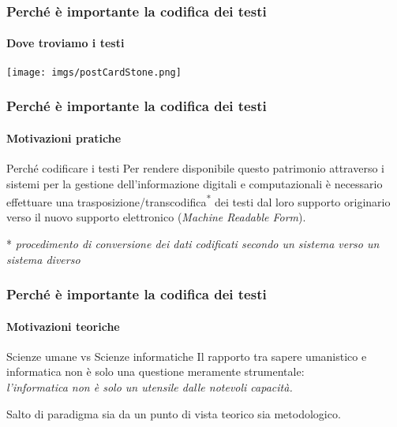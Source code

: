 \begin{frame}
    \frametitle{Perché è importante la codifica dei testi}
    \framesubtitle{Dove troviamo i testi}
    \addtocounter{nframe}{1}
    
    \begin{center}

        \texttt{[image: imgs/postCardStone.png]}

    \end{center}

\end{frame}

\begin{frame}
    \frametitle{Perché è importante la codifica dei testi}
    \framesubtitle{Motivazioni pratiche}
    \addtocounter{nframe}{1}
    
    \begin{block}{Perché codificare i testi}
        Per rendere disponibile questo patrimonio attraverso i sistemi per la gestione dell'informazione digitali e computazionali è necessario effettuare una trasposizione/transcodifica\textsuperscript{*} dei testi dal loro supporto originario verso il nuovo supporto elettronico (\textit{Machine Readable Form}).
    \end{block}

    \begin{center}
        * \textit{procedimento di conversione dei dati codificati secondo un sistema verso un sistema diverso}
    \end{center}

\end{frame}

\begin{frame}
    \frametitle{Perché è importante la codifica dei testi}
    \framesubtitle{Motivazioni teoriche}
    \addtocounter{nframe}{1}
    
    \begin{block}{Scienze umane vs Scienze informatiche}
        Il rapporto tra sapere umanistico e informatica non è solo una questione meramente strumentale:\\ 
        \textit{l'informatica non è solo un utensile dalle notevoli capacità.}

        \begin{center}
            Salto di paradigma sia da un punto di vista teorico sia metodologico.
        \end{center} 
    \end{block}

\end{frame}

